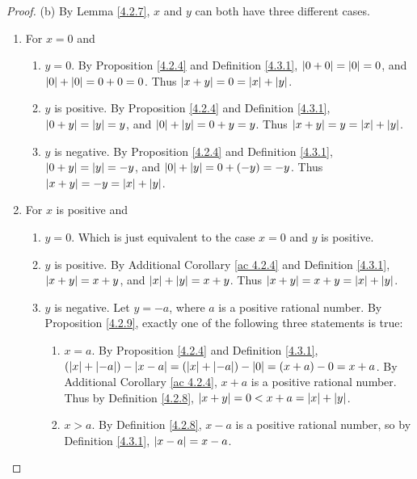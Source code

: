 \begin{proof}{(b)}
By Lemma \ref{4.2.7}, \(x\) and \(y\) can both have three different cases.
\begin{enumerate}[label=(\Roman*)]
    \item For \(x = 0\) and
    \begin{enumerate}[label=(\roman*)]
        \item \(y = 0\).
        By Proposition \ref{4.2.4} and Definition \ref{4.3.1}, \(\abs*{0 + 0} = \abs*{0} = 0\), and \(\abs*{0} + \abs*{0} = 0 + 0 = 0\).
        Thus \(\abs*{x + y} = 0 = \abs*{x} + \abs*{y}\).
        \item \(y\) is positive.
        By Proposition \ref{4.2.4} and Definition \ref{4.3.1}, \(\abs*{0 + y} = \abs*{y} = y\), and \(\abs*{0} + \abs*{y} = 0 + y = y\).
        Thus \(\abs*{x + y} = y = \abs*{x} + \abs*{y}\).
        \item \(y\) is negative.
        By Proposition \ref{4.2.4} and Definition \ref{4.3.1}, \(\abs*{0 + y} = \abs*{y} = -y\), and \(\abs*{0} + \abs*{y} = 0 + (-y) = -y\).
        Thus \(\abs*{x + y} = -y = \abs*{x} + \abs*{y}\).
    \end{enumerate}
    \item For \(x\) is positive and
    \begin{enumerate}[label=(\roman*)]
        \item \(y = 0\).
        Which is just equivalent to the case \(x = 0\) and \(y\) is positive.
        \item \(y\) is positive.
        By Additional Corollary \ref{ac 4.2.4} and Definition \ref{4.3.1}, \(\abs*{x + y} = x + y\), and \(\abs*{x} + \abs*{y} = x + y\).
        Thus \(\abs*{x + y} = x + y = \abs*{x} + \abs*{y}\).
        \item \(y\) is negative.
        Let \(y = -a\), where \(a\) is a positive rational number.
        By Proposition \ref{4.2.9}, exactly one of the following three statements is true:
        \begin{enumerate}[label=(\arabic*)]
            \item \(x = a\).
            By Proposition \ref{4.2.4} and Definition \ref{4.3.1}, \((\abs*{x} + \abs*{-a}) - \abs*{x - a} = (\abs*{x} + \abs*{-a}) - \abs*{0} = (x + a) - 0 = x + a\).
            By Additional Corollary \ref{ac 4.2.4}, \(x + a\) is a positive rational number.
            Thus by Definition \ref{4.2.8}, \(\abs*{x + y} = 0 < x + a = \abs*{x} + \abs*{y}\).
            \item \(x > a\).
            By Definition \ref{4.2.8}, \(x - a\) is a positive rational number, so by Definition \ref{4.3.1}, \(\abs*{x - a} = x - a\).

\end{enumerate}
\end{enumerate}
\end{enumerate}
\end{proof}
